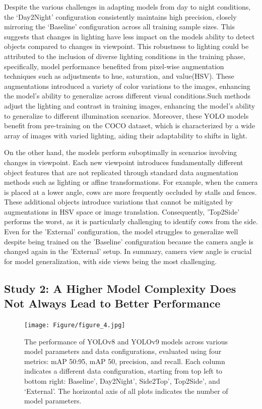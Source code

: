 Despite the various challenges in adapting models from day to night conditions, the `Day2Night' configuration consistently maintains high precision, closely mirroring the `Baseline' configuration across all training sample sizes. This suggests that changes in lighting have less impact on the models ability to detect objects compared to changes in viewpoint. This robustness to lighting could be attributed to the inclusion of diverse lighting conditions in the training phase, specifically, model performance benefited from pixel-wise augmentation techniques such as adjustments to hue, saturation, and value(HSV). These augmentations introduced a variety of color variations to the images, enhancing the model's ability to generalize across different visual conditions.Such methods adjust the lighting and contrast in training images, enhancing the model's ability to generalize to different illumination scenarios. Moreover, these YOLO models benefit from pre-training on the COCO dataset, which is characterized by a wide array of images with varied lighting, aiding their adaptability to shifts in light.

On the other hand, the models perform suboptimally in scenarios involving changes in viewpoint. Each new viewpoint introduces fundamentally different object features that are not replicated through standard data augmentation methods such as lighting or affine transformations. For example, when the camera is placed at a lower angle, cows are more frequently occluded by stalls and fences. These additional objects introduce variations that cannot be mitigated by augmentations in HSV space or image translation. Consequently, 'Top2Side' performs the worst, as it is particularly challenging to identify cows from the side. Even for the 'External' configuration, the model struggles to generalize well despite being trained on the 'Baseline' configuration because the camera angle is changed again in the 'External' setup. In summary, camera view angle is crucial for model generalization, with side views being the most challenging.




\subsection*{Study 2: A Higher Model Complexity Does Not Always Lead to Better Performance}

\begin{figure}[h]
\centering
\texttt{[image: Figure/figure\_4.jpg]}
\caption{The performance of YOLOv8 and YOLOv9 models across various model parameters and data configurations, evaluated using four metrics: mAP 50:95, mAP 50, precision, and recall. Each column indicates a different data configuration, starting from top left to bottom right: Baseline', Day2Night', Side2Top', Top2Side', and `External'. The horizontal axis of all plots indicates the number of model parameters.}
\label{fig:models}
\end{figure}



